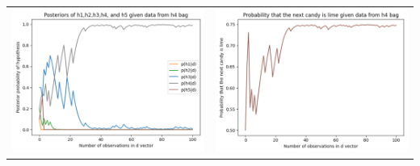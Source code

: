 \documentclass[]{article}
\begin{document}
\begin{center}
    \begin{tabular}{cc}
    \includegraphics[scale = 0.30]{2_a_posteriors_h4.png} & \includegraphics[scale = 0.30]{2_a_lime_h4.png} 
\end{tabular}
\end{center}
\end{document}
